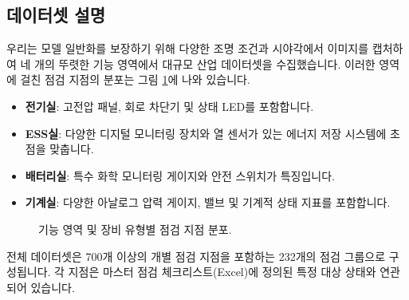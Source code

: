 \subsection{데이터셋 설명}
우리는 모델 일반화를 보장하기 위해 다양한 조명 조건과 시야각에서 이미지를 캡처하여 네 개의 뚜렷한 기능 영역에서 대규모 산업 데이터셋을 수집했습니다.
이러한 영역에 걸친 점검 지점의 분포는 그림 \ref{fig:dataset_dist}에 나와 있습니다.
\begin{itemize}
    \item \textbf{전기실}: 고전압 패널, 회로 차단기 및 상태 LED를 포함합니다.
    \item \textbf{ESS실}: 다양한 디지털 모니터링 장치와 열 센서가 있는 에너지 저장 시스템에 초점을 맞춥니다.
    \item \textbf{배터리실}: 특수 화학 모니터링 게이지와 안전 스위치가 특징입니다.
    \item \textbf{기계실}: 다양한 아날로그 압력 게이지, 밸브 및 기계적 상태 지표를 포함합니다.
\end{itemize}

\begin{figure}[h]
\centering
\fbox{\rule{0pt}{1.5in} \rule{0.8\linewidth}{0pt}} %
\caption{기능 영역 및 장비 유형별 점검 지점 분포.}
\label{fig:dataset_dist}
\end{figure}

전체 데이터셋은 700개 이상의 개별 점검 지점을 포함하는 232개의 점검 그룹으로 구성됩니다.
각 지점은 마스터 점검 체크리스트(Excel)에 정의된 특정 대상 상태와 연관되어 있습니다.

